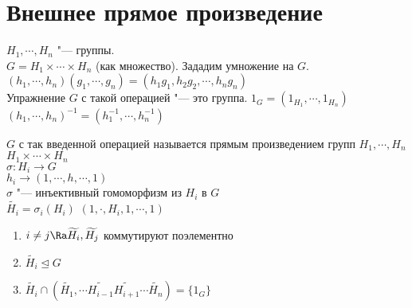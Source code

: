 ﻿\section{Внешнее прямое произведение}
$H_1, \cdots, H_n$ "--- группы.\\
$G = H_1 \times \cdots \times H_n$ (как множество).
Зададим умножение на $G$.
$(h_1,\cdots, h_n)(g_1, \cdots, g_n) = (h_1g_1, h_2g_2, \cdots, h_ng_n)$\\
Упражнение $G$ с такой операцией "--- это группа.
$1_G = (1_{H_1}, \cdots, 1_{H_n})$\\
$(h_1, \cdots, h_n)^{-1} = (h_1^{-1}, \cdots, h_n^{-1})$\\

\begin{Def}
 $G$ с так введенной операцией называется прямым произведением групп $H_1, \cdots, H_n$\\
 $H_1 \times \cdots \times H_n$\\
 $\sigma \colon H_i \to G$\\
 $h_i \to (1, \cdots,  h, \cdots, 1)$\\
 $\sigma$ "--- инъективный гомоморфизм из $H_i$ в $G$\\
 $\widetilde{H_i} = \sigma_i(H_i)$
 $(1, \cdot, H_i, 1, \cdots, 1)$\\
\end{Def}
\begin{conseq}
\begin{enumerate}
    \item $i \ne j \Ra \widetilde{H_i}, \widetilde{H_j}$ коммутируют поэлементно\\
    \item $\widetilde{H_i} \unlhd G$\\
    \item $\widetilde{H_i} \cap (\widetilde{H_1}, \cdots \widetilde{H_{i - 1}} \widetilde{H_{i + 1}} \cdots \widetilde{H_n}) = \{1_G\}$
\end{enumerate}
\end{conseq}